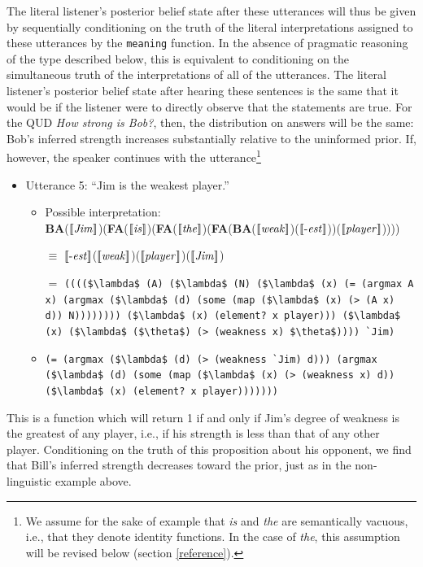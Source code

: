 \documentclass[pdfextras]{handbook}
\newcommand{\llbracket}{\ensuremath{\left [\!\left [}}%
\newcommand{\rrbracket}{\ensuremath{\right ]\!\right ]}}
\providecommand{\sv}[1]{\ensuremath{\llbracket \mathit{#1} \rrbracket}}
\begin{document}
The literal listener's posterior belief state after these utterances will thus be given by sequentially conditioning on the truth of the literal interpretations assigned to these utterances by the \lstinline{meaning} function. 
In the absence of pragmatic reasoning of the type described below, this is equivalent to conditioning on the simultaneous truth of the interpretations of all of the utterances. 
The literal listener's posterior belief state after hearing these sentences is the same that it would be if the listener were to directly observe that the statements are true. 
For the QUD \emph{How strong is Bob?}, then, the distribution on answers will be the same: Bob's inferred strength increases substantially relative to the uninformed prior. 
If, however, the speaker continues with the utterance\footnote{We assume for the sake of example that \emph{is} and \emph{the} are semantically vacuous, i.e., that they denote identity functions. In the case of \emph{the}, this assumption will be revised below (section \ref{reference}).}
\begin{itemize}
\item Utterance 5: ``Jim is the weakest player.''
\begin{itemize}
\item Possible interpretation:\\ 
\textbf{BA}(\sv{Jim})(\textbf{FA}(\sv{is})(\textbf{FA}(\sv{the})(\textbf{FA}(\textbf{BA}(\sv{weak})(\sv{\text{-}est}))(\sv{player}))))
\item [$\equiv$] \sv{\text{-}est}(\sv{weak})(\sv{player})(\sv{Jim})
\item [$=$] \lstinline[mathescape]{(((($\lambda$ (A) ($\lambda$ (N) ($\lambda$ (x) (= (argmax A x) (argmax ($\lambda$ (d) (some (map ($\lambda$ (x) (> (A x) d)) N)))))))) ($\lambda$ (x) (element? x player))) ($\lambda$ (x) ($\lambda$ ($\theta$) (> (weakness x) $\theta$)))) `Jim)}
\item [$\equiv$] \lstinline[mathescape]{(= (argmax ($\lambda$ (d) (> (weakness `Jim) d))) (argmax ($\lambda$ (d) (some (map ($\lambda$ (x) (> (weakness x) d)) ($\lambda$ (x) (element? x player)))))))    }
\end{itemize}
\end{itemize}
This is a function which will return 1 if and only if Jim's degree of weakness is the greatest of any player, i.e., if his strength is less than that of any other player. 
Conditioning on the truth of this proposition about his opponent, we find that Bill's inferred strength decreases toward the prior, just as in the non-linguistic example above. 
\end{document}
